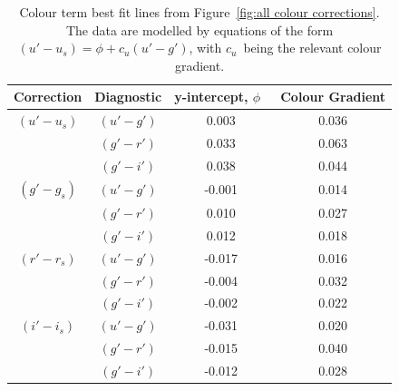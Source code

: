 \begin{table}
    \centering
    \caption{Colour term best fit lines from Figure~\ref{fig:all colour corrections}. The data are modelled by equations of the form $(u'-u_s) = \phi + c_u(u'-g')$, with $c_u$\ being the relevant colour gradient.}
    \label{table:all colour corrections}
    \begin{tabular}{cccc}
        Correction & Diagnostic &   y-intercept, $\phi$\   & Colour Gradient \\
        \hline
        \hline
          $(u'-u_s)$ &  $(u'-g')$   & 0.003 & 0.036 \\
                    &  $(g'-r')$   & 0.033 & 0.063 \\
                    &  $(g'-i')$   & 0.038 & 0.044 \\
        \hline
          $(g'-g_s)$ &  $(u'-g')$   & -0.001 & 0.014 \\
                    &  $(g'-r')$   & 0.010  & 0.027 \\
                    &  $(g'-i')$   & 0.012  & 0.018 \\
        \hline
          $(r'-r_s)$ &  $(u'-g')$   & -0.017 & 0.016 \\
                    &  $(g'-r')$   & -0.004 & 0.032 \\
                    &  $(g'-i')$   & -0.002 & 0.022 \\
        \hline
          $(i'-i_s)$ &  $(u'-g')$   & -0.031 & 0.020 \\
                    &  $(g'-r')$   & -0.015 & 0.040 \\
                    &  $(g'-i')$   & -0.012 & 0.028 \\
        \hline
        \hline
    \end{tabular}
\end{table}

